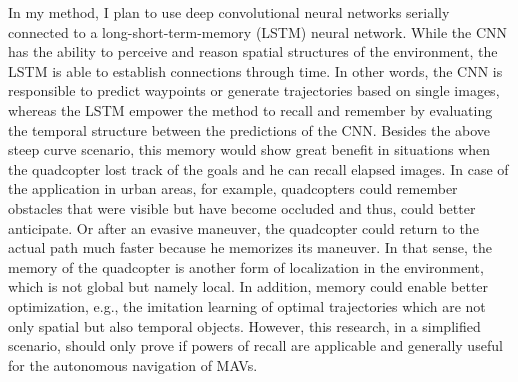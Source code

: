 In my method, I plan to use deep convolutional neural networks serially connected to a long-short-term-memory (LSTM) neural network.
While the CNN has the ability to perceive and reason spatial structures of the environment,
the LSTM is able to establish connections through time. 
In other words, the CNN is responsible to predict waypoints or generate trajectories based on single images,
whereas the LSTM empower the method to recall and remember by evaluating the temporal structure between the predictions of the CNN.
Besides the above steep curve scenario, this memory would show great benefit in situations
when the quadcopter lost track of the goals and he can recall elapsed images.
In case of the application in urban areas, for example, 
quadcopters could remember obstacles that were visible but have become occluded and thus, could better anticipate. 
Or after an evasive maneuver, the quadcopter could return to the actual path much faster because he memorizes its maneuver.
In that sense, the memory of the quadcopter is another form of localization in the environment, which is not global but namely local.
In addition, memory could enable better optimization, e.g., the imitation learning of optimal trajectories which
are not only spatial but also temporal objects.
However, this research, in a simplified scenario, should only prove if powers of recall are applicable and generally useful 
for the autonomous navigation of MAVs.











%
%
%




















